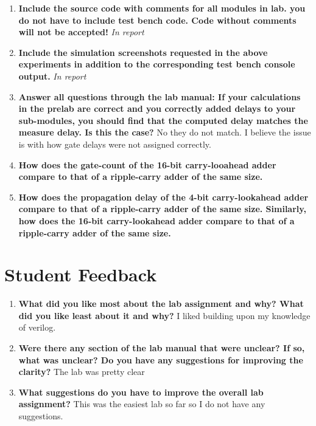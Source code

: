 \documentclass[a4paper,12pt]{article}
\begin{document}
\begin{enumerate}
  \item \textbf{Include the source code with comments for all modules in lab. you do not have to include test bench code. Code without comments will not be accepted!}
    \textit{In report}
  \item \textbf{Include the simulation screenshots requested in the above experiments in addition to the corresponding test bench console output.}
      \textit{In report}
  \item \textbf{Answer all questions through the lab manual: If your calculations in the prelab are correct and you correctly added delays to your sub-modules,
you should find that the computed delay matches the measure delay. Is this the case?}
  No they do not match. I believe the issue is with how gate delays were not assigned correctly.
  \item \textbf{How does the gate-count of the 16-bit carry-looahead adder compare to that of a ripple-carry adder of the same size.}
  \item \textbf{How does the propagation delay of the 4-bit carry-lookahead adder compare to that of a ripple-carry adder of the same size. Similarly, how does the 16-bit carry-lookahead adder compare to that of a ripple-carry adder of the same size.}
  
\end{enumerate}

\section*{Student Feedback}

\begin{enumerate}
  \item \textbf{What did you like most about the lab assignment and why? What did you like least about it and why?}
  I liked building upon my knowledge of verilog.

  \item \textbf{Were there any section of the lab manual that were unclear? If so, what was unclear? Do you have any suggestions for improving the clarity?}
  The lab was pretty clear

  \item \textbf{What suggestions do you have to improve the overall lab assignment?}
  This was the easiest lab so far so I do not have any suggestions.

\end{enumerate}
\end{document}
